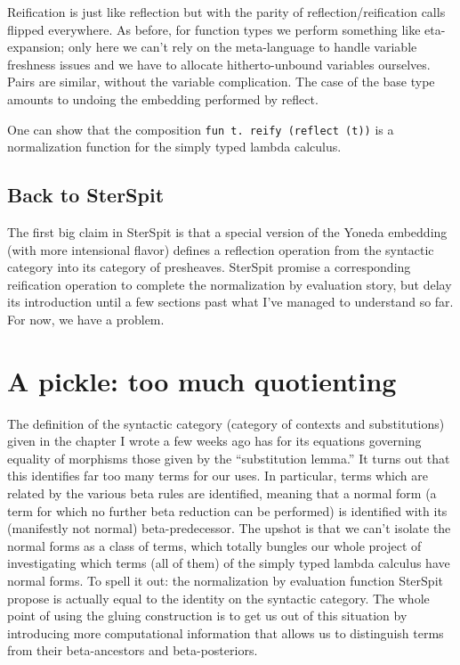 \documentclass[11pt]{article}
\begin{document}
Reification is just like reflection but with the parity of
reflection/reification calls flipped everywhere. As before, for function types
we perform something like eta-expansion; only here we can't rely on the
meta-language to handle variable freshness issues and we have to allocate
hitherto-unbound variables ourselves. Pairs are similar, without the variable
complication. The case of the base type amounts to undoing the embedding
performed by reflect.

One can show that the composition \texttt{fun t. reify (reflect (t))} is a normalization
function for the simply typed lambda calculus.

\subsection{Back to SterSpit}
\label{sec:orgcf3dc70}
The first big claim in SterSpit is that a special version of the Yoneda
embedding (with more intensional flavor) defines a reflection operation from the
syntactic category into its category of presheaves. SterSpit promise a
corresponding reification operation to complete the normalization by evaluation
story, but delay its introduction until a few sections past what I've managed to
understand so far. For now, we have a problem.

\section{A pickle: too much quotienting}
\label{sec:org291590c}
The definition of the syntactic category (category of contexts and
substitutions) given in the chapter I wrote a few weeks ago has for its
equations governing equality of morphisms those given by the ``substitution
lemma.'' It turns out that this identifies far too many terms for our uses. In
particular, terms which are related by the various beta rules are identified,
meaning that a normal form (a term for which no further beta reduction can be
performed) is identified with its (manifestly not normal) beta-predecessor. The
upshot is that we can't isolate the normal forms as a class of terms, which
totally bungles our whole project of investigating which terms (all of them) of
the simply typed lambda calculus have normal forms. To spell it out: the
normalization by evaluation function SterSpit propose is actually equal to the
identity on the syntactic category. The whole point of using the gluing
construction is to get us out of this situation by introducing more
computational information that allows us to distinguish terms from their
beta-ancestors and beta-posteriors.
\end{document}
